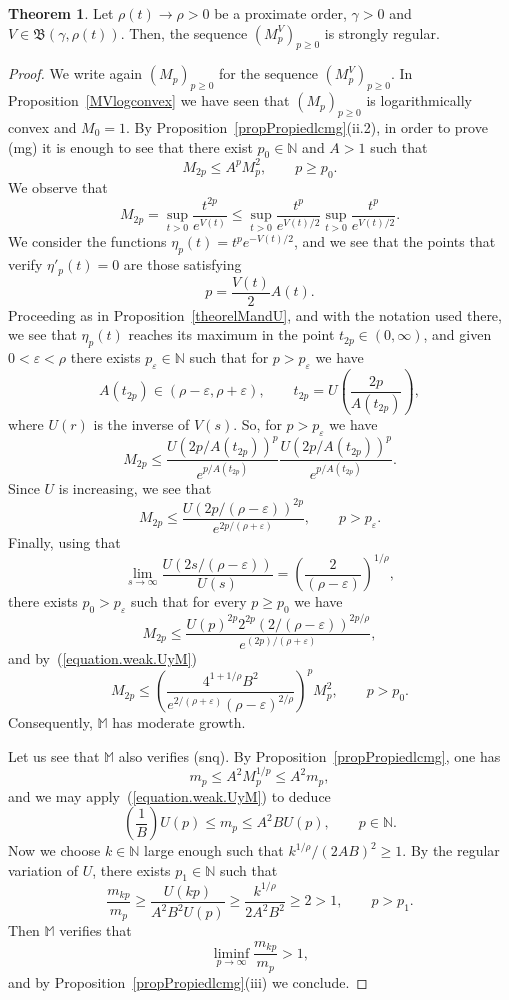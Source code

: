 \documentclass[11pt,a4paper]{article}
\theoremstyle{definition}
\newtheorem{theo}{Theorem}[section]
\def\oo{\infty}
\def\ri{\rightarrow}
\def\ep{\varepsilon}
\def\ga{\gamma}
\def\ro{\rho}
\def\Bet{\mathfrak{B}}
\def\N{\mathbb{N}}
\def\M{\mathbb{M}}
\begin{document}
\begin{theo}\label{theorem.construct.sequences.from.prox.order}
  Let $\ro(t) \ri \ro>0$ be a proximate order,  $\ga>0$ and $V \in \Bet(\ga, \ro(t) )$. Then, the
  sequence $(M^V_p)_{p\geq0}$ is strongly regular.
 \end{theo}

 \begin{proof}
 We write again $(M_p)_{p\geq0}$ for the sequence $(M^V_p)_{p\geq0}$.
 In Proposition~\ref{MVlogconvex} we have seen that  $(M_p)_{p\geq0}$ is logarithmically convex and $M_0=1$.
 By Proposition~\ref{propPropiedlcmg}(ii.2), in order to prove (mg) it is enough to see that there exist $p_0\in\N$ and $A>1$ such that
 $$M_{2p}\leq A^{p} M^2_p, \qquad p\geq p_0.$$
 We observe that
 $$M_{2p}= \sup_{t>0} \frac{t^{2p}}{e^{V(t)}}\leq \sup_{t>0} \frac{t^{p}}{e^{V(t)/2}} \sup_{t>0} \frac{t^{p}}{e^{V(t)/2}}.$$
We consider the functions $\eta_p(t)=t^p e^{-V(t)/2}$, and we see that the points that verify $\eta'_p(t)=0$ are
 those satisfying
 $$p=\frac{V(t)}{2}A(t).$$
Proceeding as in Proposition~\ref{theorelMandU}, and with the notation used there, we see that $\eta_p(t)$ reaches its maximum in the point $t_{2p}\in(0,\oo)$, and given
$0<\ep<\ro$ there exists $p_\ep\in\N$ such that for $p>p_\ep$ we have
$$A(t_{2p})\in (\ro-\ep,\ro+\ep), \qquad t_{2p}= U\left(\frac{2p}{A(t_{2p})}\right),$$
where $U(r)$ is the inverse of $V(s)$. So, for $p>p_\ep$ we have
 $$M_{2p}\leq  \frac{U\left(2p/A(t_{2p})\right)^{p}}{e^{p/A(t_{2p})}}  \frac{U\left(2p/A(t_{2p})\right)^{p}}{e^{p/A(t_{2p})}}.$$
Since $U$ is increasing, we see that
  $$M_{2p}\leq  \frac{U\left(2p/(\ro-\ep)\right)^{2p}}{e^{2p/(\ro+\ep)}},
  \qquad p >p_\ep.$$
 Finally, using that
$$\lim_{s\ri\oo}\frac{U(2s/(\ro-\ep))}{U(s)}=\left(\frac{2}{(\ro-\ep)}\right)^{1/\ro},$$
 there exists $p_0>p_\ep$ such that for every $p\geq p_0$ we have
 $$M_{2p}\leq  \frac{U(p)^{2p}2^{2p}\left(2/(\ro-\ep)\right)^{2p/\ro}}{e^{(2p)/(\ro+\ep)}},$$
 and by~(\ref{equation.weak.UyM})
  $$M_{2p}\leq  \left(\frac{4^{1+1/\ro}B^2}{e^{2/(\ro+\ep)}(\ro-\ep)^{2/\ro}}\right)^{p}M^2_p, \qquad p >p_0.$$
 Consequently, $\M$ has moderate growth.

Let us see that $\M$ also verifies (snq).
By Proposition~\ref{propPropiedlcmg}, one has
  $$m_{p}\le A^{2}M_{p}^{1/p}\le A^{2}m_{p},$$
and we may apply~(\ref{equation.weak.UyM}) to deduce
  $$\left(\frac{1}{B}\right) U(p)\leq m_p\leq A^2 B  U(p), \qquad p\in\N.$$
 Now we choose $k\in\N$ large enough such that $k^{1/\ro}/(2AB)^2\geq 1$. By the regular variation of $U$,
there exists $p_1\in\N$ such that
 $$\frac{m_{kp}}{m_{p}} \geq \frac{U(kp)}{A^2 B^2 U(p)} \geq \frac{k^{1/\ro}}{ 2A^2B^2}\geq 2>1, \qquad p>p_1.$$
 Then $\M$ verifies that
 $$\liminf_{p\ri\oo} \frac{m_{kp}}{m_p}>1,$$
and by Proposition~\ref{propPropiedlcmg}(iii) we conclude.
 \end{proof}
\end{document}

